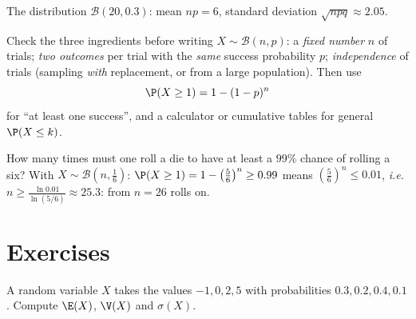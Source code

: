 \begin{omfigure}

{\small The distribution $\mathcal B(20, 0.3)$: mean $np = 6$, standard
deviation $\sqrt{npq} \approx 2.05$.}
\end{omfigure}

\begin{method}\label{met:tle:randvar:recognize}
Check the three ingredients before writing $X \sim \mathcal B(n,p)$: a
\emph{fixed number} $n$ of trials; \emph{two outcomes} per trial with the
\emph{same} success probability $p$; \emph{independence} of trials
(sampling \emph{with} replacement, or from a large population). Then use
\[
\P(X \geq 1) = 1 - (1-p)^n
\]
for ``at least one success'', and a calculator or cumulative tables for
general $\P(X \leq k)$.
\end{method}

\begin{example}\label{ex:tle:randvar:atleastone}
How many times must one roll a die to have at least a $99\%$ chance of
rolling a six? With $X \sim \mathcal B\left(n, \frac16\right)$:
$\P(X \geq 1) = 1 - \left(\frac56\right)^n \geq 0.99$ means
$\left(\frac56\right)^n \leq 0.01$, \emph{i.e.}
$n \geq \frac{\ln 0.01}{\ln(5/6)} \approx 25.3$: from $n = 26$ rolls on.
\end{example}

\section{Exercises}

\begin{exercise}[$\star$]\label{exo:tle:randvar:1}
A random variable $X$ takes the values $-1, 0, 2, 5$ with probabilities
$0.3, 0.2, 0.4, 0.1$. Compute $\E(X)$, $\V(X)$ and $\sigma(X)$.
\end{exercise}

